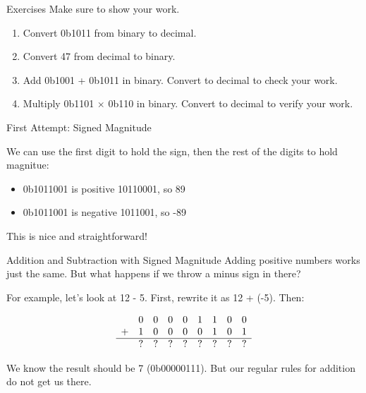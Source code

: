 \begin{frame}{Exercises}
    Make sure to show your work.
    \vfill
    \begin{enumerate}
        \item Convert 0b1011 from binary to decimal. \vfill
        \item Convert 47 from decimal to binary. \vfill
        \item Add 0b1001 + 0b1011 in binary. Convert to decimal to check your work. \vfill
        \item Multiply 0b1101 $\times$ 0b110 in binary. Convert to decimal to verify your
              work. \vfill
    \end{enumerate}
\end{frame}


\begin{frame}{First Attempt: Signed Magnitude}

    We can use the first digit to hold the sign, then the rest of the digits to
    hold magnitue:

    \begin{itemize}
        \item 0b1011001 is positive 10110001, so 89
        \item 0b1011001 is negative 1011001, so -89
    \end{itemize}

    This is nice and straightforward!

\end{frame}

\begin{frame}{Addition and Subtraction with Signed Magnitude}
    Adding positive numbers works just the same. But what happens if we throw a minus sign in there?

    For example, let's look at 12 - 5. First, rewrite it as 12 + (-5). Then:

    \[
        \begin{array}{ccccccccc}
              & 0 & 0 & 0 & 0 & 1 & 1 & 0 & 0 \\
            + & 1 & 0 & 0 & 0 & 0 & 1 & 0 & 1 \\
            \hline
              & ? & ? & ? & ? & ? & ? & ? & ? \\
        \end{array}
    \]

    We know the result should be 7 (0b00000111). But our regular rules for addition
    do not get us there.
\end{frame}

